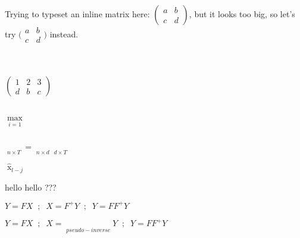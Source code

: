 \documentclass[UTF8]{article}
\begin{document}
\noindent

Trying to typeset an inline matrix here:
 $\begin{pmatrix}
  a & b\\ 
  c & d
\end{pmatrix}$,  
but it looks too big, so let's try 
$\big(\begin{smallmatrix}
  a & b\\
  c & d
\end{smallmatrix}\big)$ 
instead.

\noindent
\\



\noindent
\\
$\begin{pmatrix}
    1 & 2 & 3\\
    d & b & c
\end{pmatrix}$

\noindent
\\

$ \max \limits_{i=1} $

\noindent
\\

$ 
\mathop{\underbrace{Y}}
\limits_{n \times T}
= \mathop{\underbrace{F}}
\limits_{n \times d}
\mathop{\underbrace{X}}
\limits_{d \times T}
$

$\hat{\mathop{x}}_{l-j}$

hello
hello
???


$ Y=FX \;\; ; \;\; X=F^+Y \;\; ; \;\; Y=FF^+Y $

$ Y=FX \;\; ; \;\; X=\mathop{\underbrace{F^+}}\limits_{pseudo-inverse} Y \;\; ; \;\; Y=FF^+Y $
\end{document}
